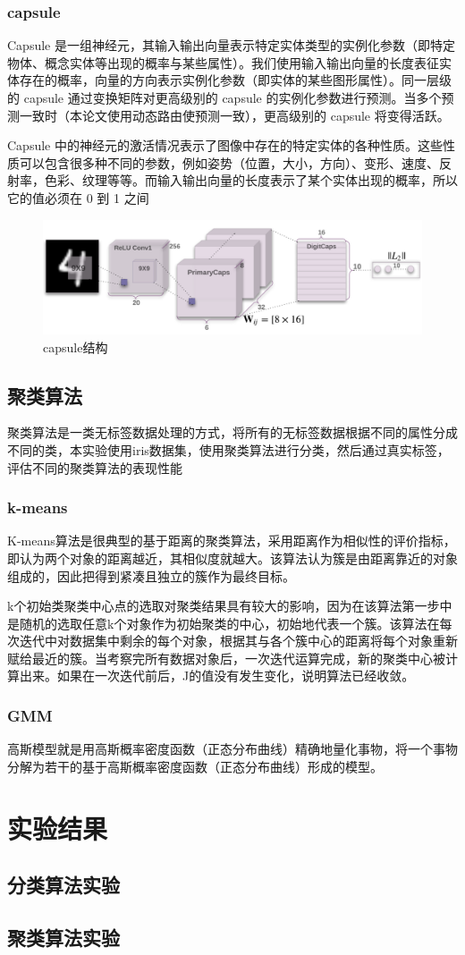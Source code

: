 \documentclass{article}
\begin{document}
	\subsubsection{capsule}
	Capsule 是一组神经元，其输入输出向量表示特定实体类型的实例化参数（即特定物体、概念实体等出现的概率与某些属性）。我们使用输入输出向量的长度表征实体存在的概率，向量的方向表示实例化参数（即实体的某些图形属性）。同一层级的 capsule 通过变换矩阵对更高级别的 capsule 的实例化参数进行预测。当多个预测一致时（本论文使用动态路由使预测一致），更高级别的 capsule 将变得活跃。
	
	Capsule 中的神经元的激活情况表示了图像中存在的特定实体的各种性质。这些性质可以包含很多种不同的参数，例如姿势（位置，大小，方向）、变形、速度、反射率，色彩、纹理等等。而输入输出向量的长度表示了某个实体出现的概率，所以它的值必须在 0 到 1 之间
	
	\begin{figure}[htbp]
	\centering\includegraphics[scale=0.3]{capsule}
	\caption{capsule结构}\label{fig:3}
	\end{figure}
	\subsection{聚类算法}
	聚类算法是一类无标签数据处理的方式，将所有的无标签数据根据不同的属性分成不同的类，本实验使用iris数据集，使用聚类算法进行分类，然后通过真实标签，评估不同的聚类算法的表现性能
	\subsubsection{k-means}
	K-means算法是很典型的基于距离的聚类算法，采用距离作为相似性的评价指标，即认为两个对象的距离越近，其相似度就越大。该算法认为簇是由距离靠近的对象组成的，因此把得到紧凑且独立的簇作为最终目标。
	
	k个初始类聚类中心点的选取对聚类结果具有较大的影响，因为在该算法第一步中是随机的选取任意k个对象作为初始聚类的中心，初始地代表一个簇。该算法在每次迭代中对数据集中剩余的每个对象，根据其与各个簇中心的距离将每个对象重新赋给最近的簇。当考察完所有数据对象后，一次迭代运算完成，新的聚类中心被计算出来。如果在一次迭代前后，J的值没有发生变化，说明算法已经收敛。
	\subsubsection{GMM}
	高斯模型就是用高斯概率密度函数（正态分布曲线）精确地量化事物，将一个事物分解为若干的基于高斯概率密度函数（正态分布曲线）形成的模型。

\section{实验结果}
\subsection{分类算法实验}
\subsection{聚类算法实验}

\end{document}
